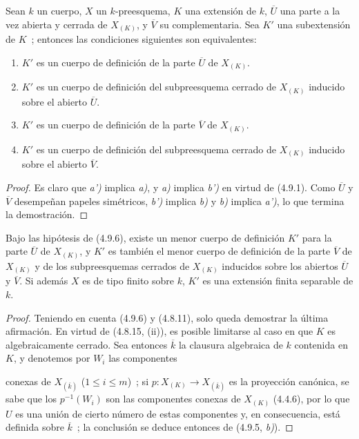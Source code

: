 \begin{proposition}[4.9.6]
\label{IV.2.4.9.6-fr}
Sean $k$ un cuerpo, $X$ un $k$-preesquema, $K$ una extensión de $k$,
$\overline U$ una parte a la vez abierta y cerrada de $X_{(K)}$, y
$\overline V$ su complementaria. Sea $K'$ una subextensión de $K$~; entonces
las condiciones siguientes son equivalentes:
\begin{enumerate}
\item[\textup{a)}] $K'$ es un cuerpo de definición de la parte $\overline U$ de
$X_{(K)}$.
\item[\textup{a')}] $K'$ es un cuerpo de definición del subpreesquema cerrado de
$X_{(K)}$ inducido sobre el abierto $\overline U$.
\item[\textup{b)}] $K'$ es un cuerpo de definición de la parte $\overline V$ de
$X_{(K)}$.
\item[\textup{b')}] $K'$ es un cuerpo de definición del subpreesquema cerrado de
$X_{(K)}$ inducido sobre el abierto $\overline V$.
\end{enumerate}
\end{proposition}

\begin{proof}
Es claro que \emph{a')} implica \emph{a)}, y \emph{a)} implica \emph{b')} en virtud de (4.9.1). Como
$\overline U$ y $\overline V$ desempeñan papeles simétricos, \emph{b')} implica \emph{b)} y
\emph{b)} implica \emph{a')}, lo que termina la demostración.
\end{proof}

\begin{corollary}[4.9.7]
\label{IV.2.4.9.7-fr}
Bajo las hipótesis de \textup{(4.9.6)}, existe un menor cuerpo de definición $K'$ para
la parte $\overline U$ de $X_{(K)}$, y $K'$ es también el menor cuerpo de
definición de la parte $\overline V$ de $X_{(K)}$ y de los
subpreesquemas cerrados de $X_{(K)}$ inducidos sobre los abiertos $\overline U$
y $\overline V$. Si además $X$ es de tipo finito sobre $k$, $K'$ es una
extensión finita separable de $k$.
\end{corollary}

\begin{proof}
Teniendo en cuenta (4.9.6) y (4.8.11), solo queda demostrar la última
afirmación. En virtud de (4.8.15, (ii)), es posible limitarse al caso en que $K$
es algebraicamente cerrado. Sea entonces $\overline k$ la clausura algebraica
de $k$ contenida en $K$, y denotemos por $W_i$ las componentes


conexas de $X_{(\overline k)}$ ($1\leq i\leq m$)~; si
$p:X_{(K)}\to X_{(\overline k)}$ es la proyección canónica, se sabe que los
$p^{-1}(W_i)$ son las componentes conexas de $X_{(K)}$ (4.4.6), por lo que
$U$ es una unión de cierto número de estas componentes y, en
consecuencia, está definida sobre $\overline k$~; la conclusión se deduce
entonces de (4.9.5, \emph{b)}).
\end{proof}
